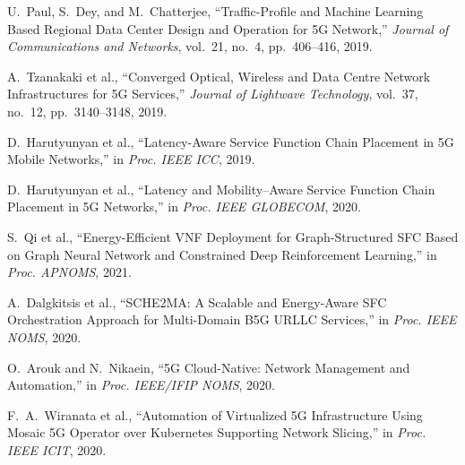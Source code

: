 \documentclass[conference]{IEEEtran}
\begin{document}
\begin{thebibliography}{99}

U.~Paul, S.~Dey, and M.~Chatterjee, ``Traffic-Profile and Machine Learning Based Regional Data Center Design and Operation for 5G Network,'' \textit{Journal of Communications and Networks}, vol.~21, no.~4, pp.~406--416, 2019.

A.~Tzanakaki et al., ``Converged Optical, Wireless and Data Centre Network Infrastructures for 5G Services,'' \textit{Journal of Lightwave Technology}, vol.~37, no.~12, pp.~3140--3148, 2019.

D.~Harutyunyan et al., ``Latency-Aware Service Function Chain Placement in 5G Mobile Networks,'' in \textit{Proc. IEEE ICC}, 2019.

D.~Harutyunyan et al., ``Latency and Mobility–Aware Service Function Chain Placement in 5G Networks,'' in \textit{Proc. IEEE GLOBECOM}, 2020.

S.~Qi et al., ``Energy-Efficient VNF Deployment for Graph-Structured SFC Based on Graph Neural Network and Constrained Deep Reinforcement Learning,'' in \textit{Proc. APNOMS}, 2021.

A.~Dalgkitsis et al., ``SCHE2MA: A Scalable and Energy-Aware SFC Orchestration Approach for Multi-Domain B5G URLLC Services,'' in \textit{Proc. IEEE NOMS}, 2020.

O.~Arouk and N.~Nikaein, ``5G Cloud-Native: Network Management and Automation,'' in \textit{Proc. IEEE/IFIP NOMS}, 2020.

F.~A.~Wiranata et al., ``Automation of Virtualized 5G Infrastructure Using Mosaic 5G Operator over Kubernetes Supporting Network Slicing,'' in \textit{Proc. IEEE ICIT}, 2020.

\end{thebibliography}
\end{document}
